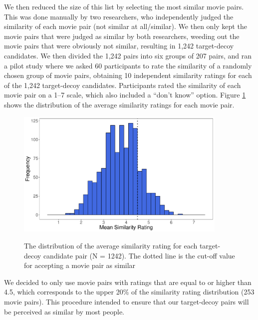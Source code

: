 \documentclass[12pt, a4paper]{article}
\begin{document}
We then reduced the size of this list by selecting the most similar movie pairs. This was done manually by two researchers, who independently judged the similarity of each movie pair (not similar at all/similar). We then only kept the movie pairs that were judged as similar by both researchers, weeding out the movie pairs that were obviously not similar, resulting in 1,242 target-decoy candidates. We then divided the 1,242 pairs into six groups of 207 pairs, and ran a pilot study where we asked 60 participants to rate the similarity of a randomly chosen group of movie pairs, obtaining 10 independent similarity ratings for each of the 1,242 target-decoy candidates. Participants rated the similarity of each movie pair on a 1--7 scale, which also included a ``don't know'' option. Figure \ref{fig:exp2_pilot}  shows the distribution of the average similarity ratings for each movie pair.

\begin{figure}[htb!]
\centering
\captionsetup{justification=centering}
		\caption{The distribution of the average similarity rating for each target-decoy candidate pair (N = 1242). The dotted line is the cut-off value for accepting a movie pair as similar}
\includegraphics[width=0.9\textwidth]{figure2.pdf}
\label{fig:exp2_pilot}
\end{figure}

We decided to only use movie pairs with ratings that are equal to or higher than 4.5, which corresponds to the upper 20\% of the similarity rating distribution (253 movie pairs). This procedure intended to ensure that our target-decoy pairs will be perceived as similar by most people.
\end{document}
